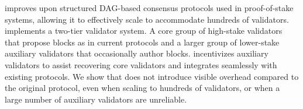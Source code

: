 \sysname improves upon structured DAG-based consensus protocols used in proof-of-stake systems, allowing it to effectively scale to accommodate hundreds of validators. \sysname implements a two-tier validator system. A core group of high-stake validators that propose blocks as in current protocols and a larger group of lower-stake auxiliary validators that occasionally author blocks. \sysname incentivizes auxiliary validators to assist recovering core validators and integrates seamlessly with existing protocols. We show that \sysname does not introduce visible overhead compared to the original protocol, even when scaling to hundreds of validators, or when a large number of auxiliary validators are unreliable.